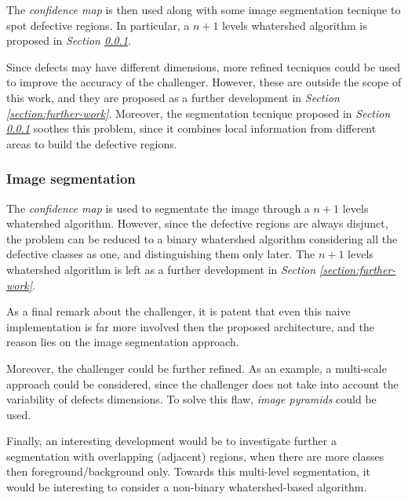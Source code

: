         \par{
            The \emph{confidence map} is then used along with some image segmentation tecnique to spot defective regions. In particular, a $n+1$ levels whatershed algorithm is proposed in \emph{Section \ref{section:challenger:image-segmentation}}.
        }
        \par{
            Since defects may have different dimensions, more refined tecniques could be used to improve the accuracy of the challenger. However, these are outside the scope of this work, and they are proposed as a further development in \emph{Section \ref{section:further-work}}. Moreover, the segmentation tecnique proposed in \emph{Section \ref{section:challenger:image-segmentation}} soothes this problem, since it combines local information from different areas to build the defective regions.
        }
    \subsubsection{Image segmentation}\label{section:challenger:image-segmentation}
        \par{
            The \emph{confidence map} is used to segmentate the image through a $n+1$ levels whatershed algorithm. However, since the defective regions are always disjunct, the problem can be reduced to a binary whatershed algorithm \cite{ieee:87344} considering all the defective classes as one, and distinguishing them only later. The $n+1$ levels whatershed algorithm is left as a further development in \emph{Section \ref{section:further-work}}.
        }
        \par{
            As a final remark about the challenger, it is patent that even this naive implementation is far more involved then the proposed architecture, and the reason lies on the image segmentation approach.
        }
    \par{
        Moreover, the challenger could be further refined. As an example, a multi-scale approach could be considered, since the challenger does not take into account the variability of defects dimensions. To solve this flaw, \emph{image pyramids} could be used.
    }
    \par{
        Finally, an interesting development would be to investigate further a segmentation with overlapping (adjacent) regions, when there are more classes then foreground/background only. Towards this multi-level segmentation, it would be interesting to consider a non-binary whatershed-based algorithm.
    }